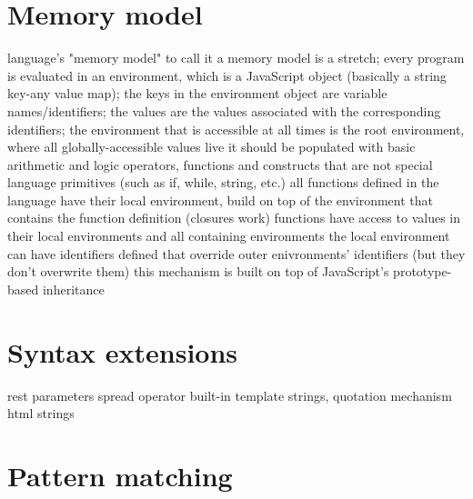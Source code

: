 \section{Memory model}

language's "memory model"
    to call it a memory model is a stretch;
    every program is evaluated in an environment, which is a JavaScript object (basically a string key-any value map);
    the keys in the environment object are variable names/identifiers;
    the values are the values associated with the corresponding identifiers;
    the environment that is accessible at all times is the root environment, where all globally-accessible values live
    it should be populated with basic arithmetic and logic operators, functions and constructs that are not special language primitives (such as if, while, string, etc.)
    all functions defined in the language have their local environment, build on top of the environment that contains the function definition (closures work)
    functions have access to values in their local environments and all containing environments
    the local environment can have identifiers defined that override outer enivronments' identifiers (but they don't overwrite them)
    this mechanism is built on top of JavaScript's prototype-based inheritance


\section{Syntax extensions}
rest parameters
spread operator
built-in template strings, quotation mechanism
html strings 

\section{Pattern matching}